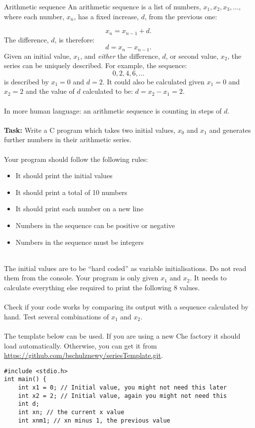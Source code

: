 \documentclass{lab}
\begin{document}
\begin{task}{Arithmetic sequence}{}
An arithmetic sequence is a list of numbers, $x_1, x_2, x_3, ...$, where each number, $x_n$, has a fixed increase, $d$, from the previous one:

\begin{equation}
x_{n} = x_{n-1} + d.
\end{equation}
The difference, $d$, is therefore:
\begin{equation}
d = x_n - x_{n-1}.
\end{equation}
Given an initial value, $x_1$, and \textit{either} the difference, $d$, or second value, $x_2$, the series can be uniquely described.
For example, the sequence:
\begin{equation}
0, 2, 4, 6, ...
\end{equation}
is described by $x_1 = 0$ and $d = 2$. It could also be calculated given $x_1 = 0$ and $x_2 = 2$ and the value of $d$ calculated to be: $d = x_2 - x_1 = 2$.
\\ \\
In more human language: an arithmetic sequence is counting in steps of $d$.
\\ \\
\textbf{Task:} Write a C program which takes two initial values, $x_0$ and $x_1$ and generates further numbers in their arithmetic series.
\\ \\
Your program should follow the following rules:
\begin{itemize}
\item It should print the initial values
\item It should print a total of 10 numbers
\item It should print each number on a new line
\item Numbers in the sequence can be positive or negative
\item Numbers in the sequence must be integers
\end{itemize}
~ \\
The initial values are to be ``hard coded'' as variable initialisations. Do not read them from the console. Your program is only given $x_1$ and $x_2$. It needs to calculate everything else required to print the following 8 values.
\\ \\
Check if your code works by comparing its output with a sequence calculated by hand. Test several combinations of $x_1$ and $x_2$.
\\ \\
The template below can be used. If you are using a new Che factory it should load automatically. Otherwise, you can get it from \url{https://github.com/bschulznewy/seriesTemplate.git}.
\begin{lstlisting}[style=pseudo]
#include <stdio.h>
int main() {
	int x1 = 0; // Initial value, you might not need this later
	int x2 = 2; // Initial value, again you might not need this
	int d;
	int xn; // the current x value
	int xnm1; // xn minus 1, the previous value


\end{lstlisting}
\end{task}
\end{document}
